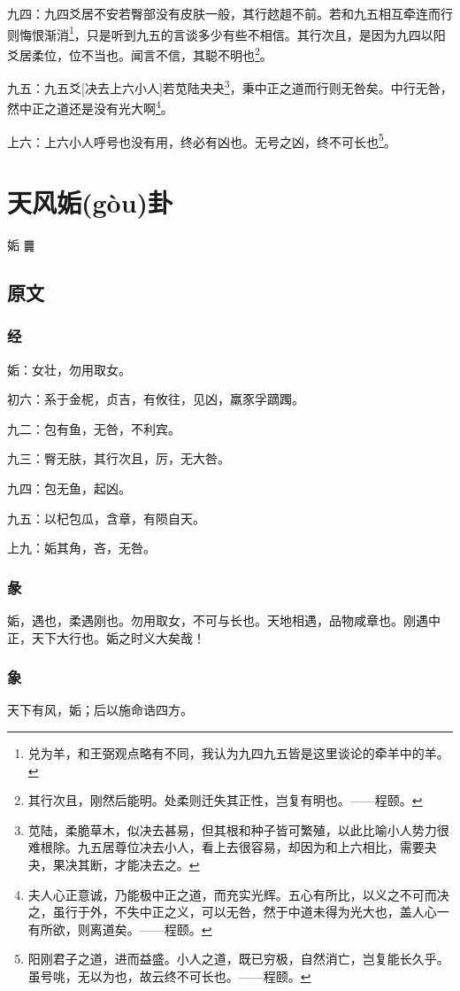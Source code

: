 \documentclass[12pt,oneside]{book}
\begin{document}
九四：九四爻居不安若臀部没有皮肤一般，其行趑趄不前。若和九五相互牵连而行则悔恨渐消\footnote{兑为羊，和王弼观点略有不同，我认为九四九五皆是这里谈论的牵羊中的羊。}，只是听到九五的言谈多少有些不相信。其行次且，是因为九四以阳爻居柔位，位不当也。闻言不信，其聪不明也\footnote{其行次且，刚然后能明。处柔则迁失其正性，岂复有明也。——程颐。}。

九五：九五爻[决去上六小人]若苋陆夬夬\footnote{苋陆，柔脆草木，似决去甚易，但其根和种子皆可繁殖，以此比喻小人势力很难根除。九五居尊位决去小人，看上去很容易，却因为和上六相比，需要夬夬，果决其断，才能决去之。}，秉中正之道而行则无咎矣。中行无咎，然中正之道还是没有光大啊\footnote{夫人心正意诚，乃能极中正之道，而充实光辉。五心有所比，以义之不可而决之，虽行于外，不失中正之义，可以无咎，然于中道未得为光大也，盖人心一有所欲，则离道矣。——程颐。}。

上六：上六小人呼号也没有用，终必有凶也。无号之凶，终不可长也\footnote{阳刚君子之道，进而益盛。小人之道，既已穷极，自然消亡，岂复能长久乎。虽号咷，无以为也，故云终不可长也。——程颐。}。



\chapter{天风姤(gòu)卦}
姤 {\Large ䷫}

\section{原文}

\subsection{经}
姤：女壮，勿用取女。

初六：系于金柅，贞吉，有攸往，见凶，羸豕孚蹢躅。

九二：包有鱼，无咎，不利宾。

九三：臀无肤，其行次且，厉，无大咎。

九四：包无鱼，起凶。

九五：以杞包瓜，含章，有陨自天。

上九：姤其角，吝，无咎。


\subsection{彖}
姤，遇也，柔遇刚也。勿用取女，不可与长也。天地相遇，品物咸章也。刚遇中正，天下大行也。姤之时义大矣哉！

\subsection{象}
天下有风，姤；后以施命诰四方。
\end{document}
